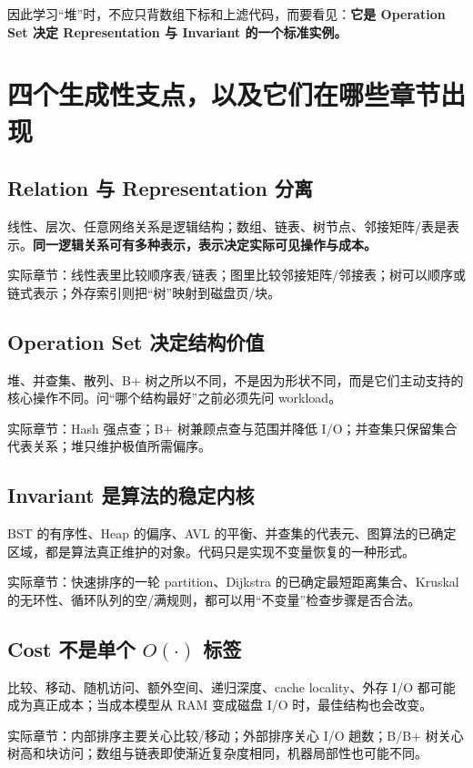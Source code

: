 \documentclass[11pt,a4paper,openany]{ctexbook}
\newcommand{\key}[1]{\textbf{\color{deep}#1}}
\begin{document}
因此学习“堆”时，不应只背数组下标和上滤代码，而要看见：\key{它是 Operation Set 决定 Representation 与 Invariant 的一个标准实例。}

\section{四个生成性支点，以及它们在哪些章节出现}
\subsection{Relation 与 Representation 分离}
线性、层次、任意网络关系是逻辑结构；数组、链表、树节点、邻接矩阵/表是表示。\key{同一逻辑关系可有多种表示，表示决定实际可见操作与成本。}

实际章节：线性表里比较顺序表/链表；图里比较邻接矩阵/邻接表；树可以顺序或链式表示；外存索引则把“树”映射到磁盘页/块。

\subsection{Operation Set 决定结构价值}
堆、并查集、散列、B+ 树之所以不同，不是因为形状不同，而是它们主动支持的核心操作不同。问“哪个结构最好”之前必须先问 workload。

实际章节：Hash 强点查；B+ 树兼顾点查与范围并降低 I/O；并查集只保留集合代表关系；堆只维护极值所需偏序。

\subsection{Invariant 是算法的稳定内核}
BST 的有序性、Heap 的偏序、AVL 的平衡、并查集的代表元、图算法的已确定区域，都是算法真正维护的对象。代码只是实现不变量恢复的一种形式。

实际章节：快速排序的一轮 partition、Dijkstra 的已确定最短距离集合、Kruskal 的无环性、循环队列的空/满规则，都可以用“不变量”检查步骤是否合法。

\subsection{Cost 不是单个 \texorpdfstring{$O(\cdot)$}{O(·)} 标签}
比较、移动、随机访问、额外空间、递归深度、cache locality、外存 I/O 都可能成为真正成本；当成本模型从 RAM 变成磁盘 I/O 时，最佳结构也会改变。

实际章节：内部排序主要关心比较/移动；外部排序关心 I/O 趟数；B/B+ 树关心树高和块访问；数组与链表即使渐近复杂度相同，机器局部性也可能不同。
\end{document}
